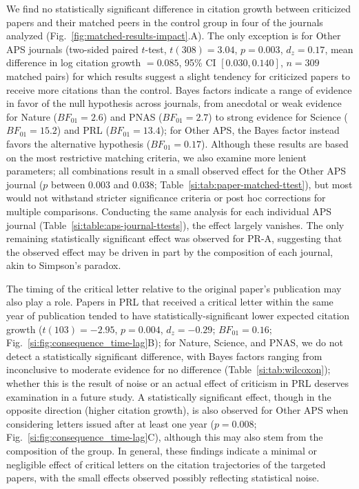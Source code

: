 \documentclass[12pt,a4paper]{article}
\numberwithin{equation}{section}
\begin{document}
We find no statistically significant difference in citation growth between criticized papers and their matched peers in the control group in four of the journals analyzed (Fig.~\ref*{fig:matched-results-impact}.A).
The only exception is for Other APS journals (two-sided paired $t$-test, $t(308) = 3.04$, $p = 0.003$, $d_z = 0.17$, mean difference in log citation growth $= 0.085$, 95\% CI $[0.030, 0.140]$, $n = 309$ matched pairs) for which results suggest a slight tendency for criticized papers to receive more citations than the control.
Bayes factors indicate a range of evidence in favor of the null hypothesis across journals, from anecdotal or weak evidence for Nature ($BF_{01} = 2.6$) and PNAS ($BF_{01} = 2.7$) to strong evidence for Science ($BF_{01} = 15.2$) and PRL ($BF_{01} = 13.4$); for Other APS, the Bayes factor instead favors the alternative hypothesis ($BF_{01} = 0.17$).
Although these results are based on the most restrictive matching criteria, we also examine more lenient parameters; all combinations result in a small observed effect for the Other APS journal ($p$ between 0.003 and 0.038; Table~\ref*{si:tab:paper-matched-ttest}), but most would not withstand stricter significance criteria or post hoc corrections for multiple comparisons.
Conducting the same analysis for each individual APS journal (Table~\ref{si:table:aps-journal-ttests}), the effect largely vanishes.
The only remaining statistically significant effect was observed for PR-A, suggesting that the observed effect may be driven in part by the composition of each journal, akin to Simpson's paradox.

The timing of the critical letter relative to the original paper's publication may also play a role. 
Papers in PRL that received a critical letter within the same year of publication tended to have statistically-significant lower expected citation growth ($t(103) = -2.95$, $p = 0.004$, $d_z = -0.29$; $BF_{01} = 0.16$; Fig.~\ref*{si:fig:consequence_time-lag}B); for Nature, Science, and PNAS, we do not detect a statistically significant difference, with Bayes factors ranging from inconclusive to moderate evidence for no difference (Table~\ref*{si:tab:wilcoxon});
whether this is the result of noise or an actual effect of criticism in PRL deserves examination in a future study.
A statistically significant effect, though in the opposite direction (higher citation growth), is also observed for Other APS when considering letters issued after at least one year ($p = 0.008$; Fig.~\ref*{si:fig:consequence_time-lag}C), although this may also stem from the composition of the group. 
In general, these findings indicate a minimal or negligible effect of critical letters on the citation trajectories of the targeted papers, with the small effects observed possibly reflecting statistical noise.
\end{document}
